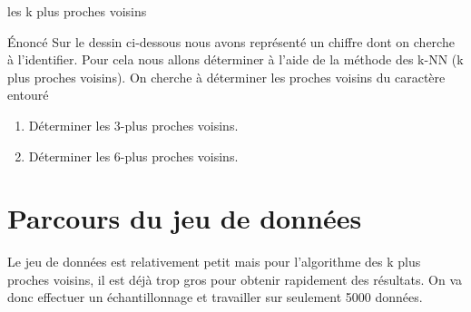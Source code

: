 \documentclass[usenames,dvipsnames,hyperref={pdfpagemode=FullScreen},9pt,t]{beamer}
\begin{document}
\begin{frame}{les k plus proches voisins}
  \begin{block}{Énoncé}
    Sur le dessin ci-dessous nous avons représenté un chiffre dont on cherche à l'identifier. Pour cela nous allons déterminer à l'aide de la méthode des k-NN (k plus proches voisins).
        On cherche à déterminer les proches voisins du caractère entouré
   \end{block} 

    \begin{enumerate}
        \item Déterminer les 3-plus proches voisins.
        \item Déterminer les 6-plus proches voisins.
    \end{enumerate}

\end{frame}

\section{Parcours du jeu de données}

    Le jeu de données est relativement petit mais pour l'algorithme des k
plus proches voisins, il est déjà trop gros pour obtenir rapidement des
résultats. On va donc effectuer un échantillonnage et travailler sur
seulement 5000 données.
\end{document}
